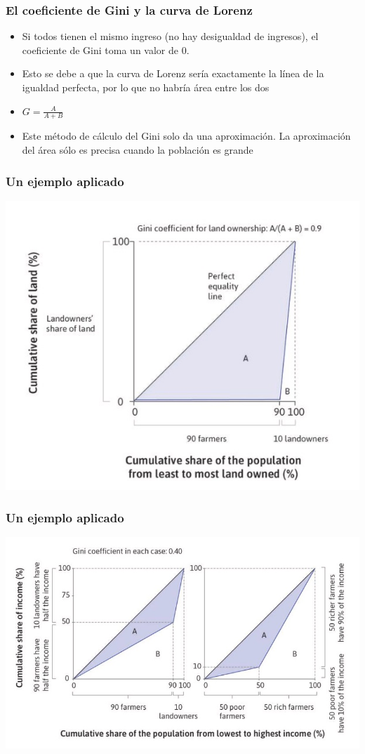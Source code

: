 \documentclass{beamer}
\begin{document}
\begin{frame} 
\frametitle{El coeficiente de Gini y la curva de Lorenz}
\begin{itemize}
\item Si todos tienen el mismo ingreso (no hay desigualdad de ingresos), el coeficiente de Gini toma un valor de 0.
\item Esto se debe a que la curva de Lorenz sería exactamente la línea de la igualdad perfecta, por lo que no habría área entre los dos
\item $G=\frac{A}{A+B}$
\item Este método de cálculo del Gini solo da una aproximación. La aproximación del área sólo es precisa cuando la población es grande
\end{itemize}
\end{frame}

\begin{frame} 
\frametitle{Un ejemplo aplicado}
    \begin{center}    
    \includegraphics[scale=0.55]{../Tema_04.18_lorenz3.jpg}
    \end{center}
\end{frame}

\begin{frame} 
\frametitle{Un ejemplo aplicado}
    \begin{center}    
    \includegraphics[scale=0.55]{../Tema_04.20_variedaddesigual.jpg}
    \end{center}
\end{frame}
\end{document}

